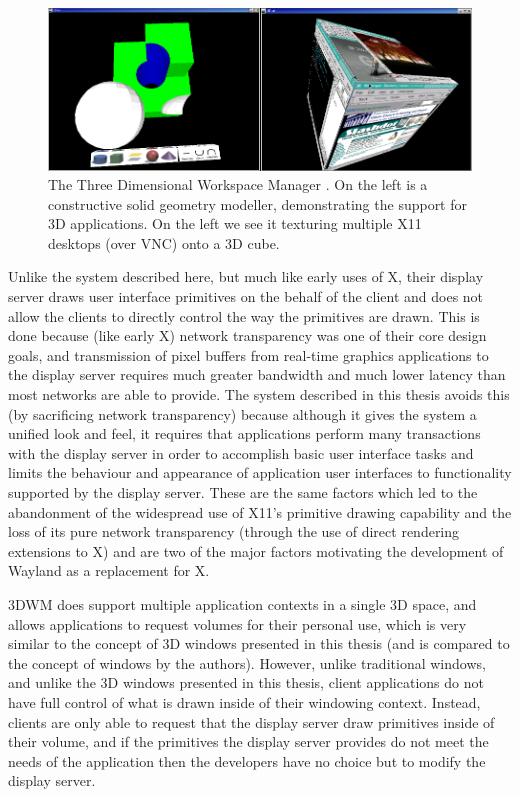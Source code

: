 \begin{figure}[ht!]
\centering
\includegraphics[width=1.0\textwidth]{images/3dwm.png}
\caption{The Three Dimensional Workspace Manager \protect\cite{3dwm}. On the left is a constructive solid geometry modeller, demonstrating the support for 3D applications. On the left we see it texturing multiple X11 desktops (over VNC) onto a 3D cube.}
\end{figure}

Unlike the system described here, but much like early uses of X, their display server draws user interface primitives on the behalf of the client and does not allow the clients to directly control the way the primitives are drawn. This is done because (like early X) network transparency was one of their core design goals, and transmission of pixel buffers from real-time graphics applications to the display server requires much greater bandwidth and much lower latency than most networks are able to provide. The system described in this thesis avoids this (by sacrificing network transparency) because although it gives the system a unified look and feel, it requires that applications perform many transactions with the display server in order to accomplish basic user interface tasks and limits the behaviour and appearance of application user interfaces to functionality supported by the display server. These are the same factors which led to the abandonment of the widespread use of X11's primitive drawing capability and the loss of its pure network transparency (through the use of direct rendering extensions to X) and are two of the major factors motivating the development of Wayland as a replacement for X. 

3DWM does support multiple application contexts in a single 3D space, and allows applications to request volumes for their personal use, which is very similar to the concept of 3D windows presented in this thesis (and is compared to the concept of windows by the authors). However, unlike traditional windows, and unlike the 3D windows presented in this thesis, client applications do not have full control of what is drawn inside of their windowing context. Instead, clients are only able to request that the display server draw primitives inside of their volume, and if the primitives the display server provides do not meet the needs of the application then the developers have no choice but to modify the display server.

